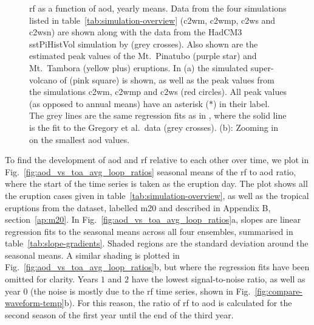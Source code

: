 \documentclass{ametsocV6.1}
\begin{document}
\begin{figure}
  \caption{\gls{rf} as a function of \gls{aod}, yearly means. Data from the four
    simulations listed in table~\ref{tab:simulation-overview} (\gls{c2wm}, \gls{c2wmp},
    \gls{c2ws} and \gls{c2wsn}) are shown along with the data from the HadCM3 sstPiHistVol
    simulation by \citet{gregory2016} (grey crosses). Also shown are the estimated peak
    values of the Mt.\ Pinatubo (purple star) and Mt.\ Tambora (yellow plus) eruptions. In
    (a) the simulated super-volcano of \citet{jones2005} (pink square) is shown, as well as
    the peak values from the simulations \gls{c2wm}, \gls{c2wmp} and \gls{c2ws} (red
    circles). All peak values (as opposed to annual means) have an asterisk (\(\ast{}\)) in
    their label. The grey lines are the same regression fits as in \citet[][Fig.\
      4]{gregory2016}, where the solid line is the fit to the Gregory et al.\ data (grey
    crosses). (b): Zooming in on the smallest \gls{aod}
    values.}\label{fig:aod_vs_toa_ses_avg}%
\end{figure}

To find the development of \gls{aod} and \gls{rf} relative to each other over time, we
plot in Fig.~\ref{fig:aod_vs_toa_avg_loop_ratios} seasonal means of the \gls{rf} to
\gls{aod} ratio, where the start of the time series is taken as the eruption day. The
plot shows all the eruption cases given in table~\ref{tab:simulation-overview}, as well
as the tropical eruptions from the \citet{marshall2020dataset} dataset, labelled
\gls{m20} and described in Appendix B, section~\ref{ap:m20}. In
Fig.~\ref{fig:aod_vs_toa_avg_loop_ratios}a, slopes are linear regression fits to the
seasonal means across all four ensembles, summarised in table~\ref{tab:slope-gradients}.
Shaded regions are the standard deviation around the seasonal means. A similar shading
is plotted in Fig.~\ref{fig:aod_vs_toa_avg_loop_ratios}b, but where the regression fits
have been omitted for clarity. Years \(1\) and \(2\) have the lowest signal-to-noise
ratio, as well as year \(0\) (the noise is mostly due to the \gls{rf} time series, shown
in Fig.~\ref{fig:compare-waveform-temp}b). For this reason, the ratio of \gls{rf} to
\gls{aod} is calculated for the second season of the first year until the end of the
third year.
\end{document}
